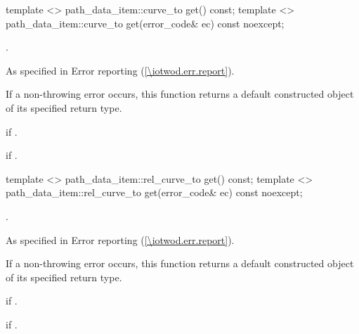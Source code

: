 \begin{itemdecl}
    template <>
    path_data_item::curve_to get() const;
    template <>
    path_data_item::curve_to get(error_code& ec) const noexcept;
\end{itemdecl}
\begin{itemdescr}
	\pnum
	\returns
	.
	
	\pnum
	\throws
	As specified in Error reporting (\ref{\iotwod.err.report}).
	
	\pnum
	\remarks
	If a non-throwing error occurs, this function returns a default constructed object of its specified return type.
	
	\pnum
	\errors
	 if .
	
	\pnum
	 if .

\end{itemdescr}

\begin{itemdecl}
    template <>
    path_data_item::rel_curve_to get() const;
    template <>
    path_data_item::rel_curve_to get(error_code& ec) const noexcept;
\end{itemdecl}
\begin{itemdescr}
	\pnum
	\returns
	.
	
	\pnum
	\throws
	As specified in Error reporting (\ref{\iotwod.err.report}).
	
	\pnum
	\remarks
	If a non-throwing error occurs, this function returns a default constructed object of its specified return type.
	
	\pnum
	\errors
	 if .
	
	\pnum
	 if .

\end{itemdescr}

